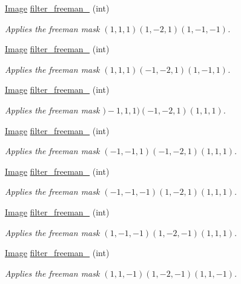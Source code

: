 \begin{DoxyCompactItemize}
\hyperlink{class_image}{Image} \hyperlink{class_image_ab25fe6e85844905599119faf087968aa}{filter\-\_\-freeman\-\_} (int)
\begin{DoxyCompactList}\small\item\em Applies the freeman mask $(1,1,1)(1,-2,1)(1,-1,-1)$. \end{DoxyCompactList}\item 
\hyperlink{class_image}{Image} \hyperlink{class_image_a2f0919c597afa2427d139012d99eabd2}{filter\-\_\-freeman\-\_} (int)
\begin{DoxyCompactList}\small\item\em Applies the freeman mask $(1,1,1)(-1,-2,1)(1,-1,1)$. \end{DoxyCompactList}\item 
\hyperlink{class_image}{Image} \hyperlink{class_image_a0f095fc1129cd6d3856f98e0e0434f24}{filter\-\_\-freeman\-\_} (int)
\begin{DoxyCompactList}\small\item\em Applies the freeman mask $)-1,1,1)(-1,-2,1)(1,1,1)$. \end{DoxyCompactList}\item 
\hyperlink{class_image}{Image} \hyperlink{class_image_a4efc2b9483472b31aa05ec3104569111}{filter\-\_\-freeman\-\_} (int)
\begin{DoxyCompactList}\small\item\em Applies the freeman mask $(-1,-1,1)(-1,-2,1)(1,1,1)$. \end{DoxyCompactList}\item 
\hyperlink{class_image}{Image} \hyperlink{class_image_a9bcd8a39cadee68de81ea8a35c832a94}{filter\-\_\-freeman\-\_} (int)
\begin{DoxyCompactList}\small\item\em Applies the freeman mask $(-1,-1,-1)(1,-2,1)(1,1,1)$. \end{DoxyCompactList}\item 
\hyperlink{class_image}{Image} \hyperlink{class_image_a22c69e4b9c06a20381be1f27c75c2745}{filter\-\_\-freeman\-\_} (int)
\begin{DoxyCompactList}\small\item\em Applies the freeman mask $(1,-1,-1)(1,-2,-1)(1,1,1)$. \end{DoxyCompactList}\item 
\hyperlink{class_image}{Image} \hyperlink{class_image_a09cddc961c37f59f8e4fe298d7bef2eb}{filter\-\_\-freeman\-\_} (int)
\begin{DoxyCompactList}\small\item\em Applies the freeman mask $(1,1,-1)(1,-2,-1)(1,1,-1)$. \end{DoxyCompactList}\item 

\end{DoxyCompactItemize}
